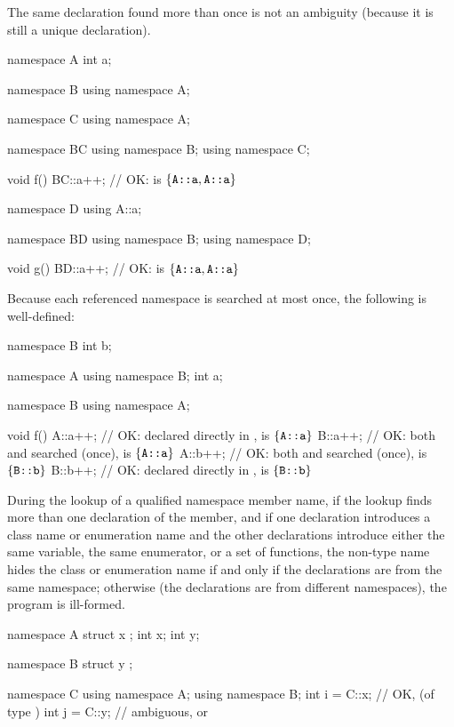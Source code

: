 \pnum
\begin{note}
The same declaration found more than once is not an ambiguity (because
it is still a unique declaration).
\begin{example}
\begin{codeblock}
namespace A {
  int a;
}

namespace B {
  using namespace A;
}

namespace C {
  using namespace A;
}

namespace BC {
  using namespace B;
  using namespace C;
}

void f()
{
  BC::a++;          // OK:  is $\{ \texttt{A::a}, \texttt{A::a} \}$
}

namespace D {
  using A::a;
}

namespace BD {
  using namespace B;
  using namespace D;
}

void g()
{
  BD::a++;          // OK:  is $\{ \texttt{A::a}, \texttt{A::a} \}$
}
\end{codeblock}
\end{example}
\end{note}

\pnum
\begin{example}
Because each referenced namespace is searched at most once, the
following is well-defined:
\begin{codeblock}
namespace B {
  int b;
}

namespace A {
  using namespace B;
  int a;
}

namespace B {
  using namespace A;
}

void f()
{
  A::a++;           // OK:  declared directly in ,  is $\{ \texttt{A::a} \}$
  B::a++;           // OK: both  and  searched (once),  is $\{ \texttt{A::a} \}$
  A::b++;           // OK: both  and  searched (once),  is $\{ \texttt{B::b} \}$
  B::b++;           // OK:  declared directly in ,  is $\{ \texttt{B::b} \}$
}
\end{codeblock}
\end{example}

\pnum
During the lookup of a qualified namespace member name, if the lookup
finds more than one declaration of the member, and if one declaration
introduces a class name or enumeration name and the other declarations
introduce either the same variable, the same enumerator, or a set of
functions, the non-type name hides the class or enumeration name if and
only if the declarations are from the same namespace; otherwise (the
declarations are from different namespaces), the program is ill-formed.
\begin{example}
\begin{codeblock}
namespace A {
  struct x { };
  int x;
  int y;
}

namespace B {
  struct y { };
}

namespace C {
  using namespace A;
  using namespace B;
  int i = C::x;     // OK,  (of type )
  int j = C::y;     // ambiguous,  or 
}
\end{codeblock}
\end{example}

